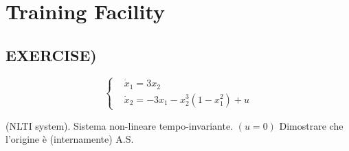 
\chapter{Training Facility}
\label{cap:training}

\section{EXERCISE)}

\[
	\left\{
	\begin{aligned}
	&\dot{x}_1 = 3x_2\\
	&\dot{x}_2 = -3x_1 - x_2^3(1-x_1^2) + u
	\end{aligned}
	\right.
\]

(NLTI system). Sistema non-lineare tempo-invariante.
$(u=0)$ Dimostrare che l'origine è (internamente) A.S.

